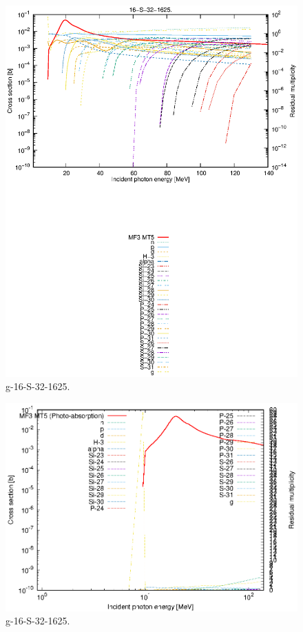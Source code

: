 \begin{figure}
 \includegraphics[width=\linewidth]{eps/g_16-S-32_1625.eps}
  \caption{g-16-S-32-1625.}
\end{figure}
\newpage \clearpage

\begin{figure}
 \includegraphics[width=\linewidth]{eps-log/g_16-S-32_1625.eps}
 \caption{g-16-S-32-1625.}
\end{figure}
\newpage \clearpage

